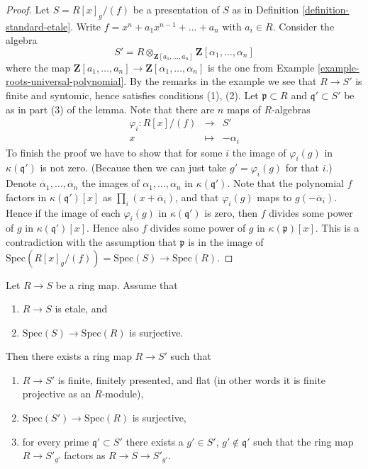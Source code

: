 \begin{proof}
Let $S = R[x]_{g}/(f)$ be a presentation of $S$ as in
Definition \ref{definition-standard-etale}.
Write $f = x^n + a_1 x^{n - 1} + \ldots + a_n$ with $a_i \in R$.
Consider the algebra
$$
S' =
R \otimes_{\mathbf{Z}[a_1, \ldots, a_n]} \mathbf{Z}[\alpha_1, \ldots, \alpha_n]
$$
where the map
$\mathbf{Z}[a_1, \ldots, a_n] \to \mathbf{Z}[\alpha_1, \ldots, \alpha_n]$
is the one from Example \ref{example-roots-universal-polynomial}.
By the remarks in the example we see that $R \to S'$ is finite and
syntomic, hence satisfies conditions (1), (2).
Let $\mathfrak p \subset R$ and $\mathfrak q' \subset S'$ be
as in part (3) of the lemma. Note that there are
$n$ maps of $R$-algebras
\begin{eqnarray*}
\varphi_i : R[x]/(f) & \longrightarrow & S' \\
x & \longmapsto & -\alpha_i
\end{eqnarray*}
To finish the proof we have to show that for some $i$ the
image of $\varphi_i(g)$ in $\kappa(\mathfrak q')$ is not zero.
(Because then we can just take $g' = \varphi_i(g)$ for that $i$.)
Denote $\overline{\alpha}_1, \ldots, \overline{\alpha}_n$ the images
of $\alpha_1, \ldots, \alpha_n$ in $\kappa(\mathfrak q')$.
Note that the polynomial $f$ factors in $\kappa(\mathfrak q')[x]$
as $\prod_i (x + \overline{\alpha}_i)$, and that $\varphi_i(g)$ maps
to $g(-\overline{\alpha}_i)$. Hence if the image of each
$\varphi_i(g)$ in $\kappa(\mathfrak q')$ is zero, then
$f$ divides some power of $g$ in $\kappa(\mathfrak q')[x]$.
Hence also $f$ divides some power of $g$ in
$\kappa(\mathfrak p)[x]$. This is a contradiction with the
assumption that $\mathfrak p$ is in the image of
$\text{Spec}(R[x]_{g}/(f)) = \text{Spec}(S) \to \text{Spec}(R)$.
\end{proof}

\begin{lemma}
\label{lemma-etale-finite-flat-zariski}
Let $R \to S$ be a ring map.
Assume that
\begin{enumerate}
\item $R \to S$ is etale, and
\item $\text{Spec}(S) \to \text{Spec}(R)$ is surjective.
\end{enumerate}
Then there exists a ring map $R \to S'$ such that
\begin{enumerate}
\item $R \to S'$ is finite, finitely presented, and flat
(in other words it is finite projective as an $R$-module),
\item $\text{Spec}(S') \to \text{Spec}(R)$ is surjective,
\item for every prime $\mathfrak q' \subset S'$ there exists a
$g' \in S'$, $g' \not \in \mathfrak q'$ such that
the ring map $R \to S'_{g'}$ factors as $R \to S \to S'_{g'}$.
\end{enumerate}
\end{lemma}

